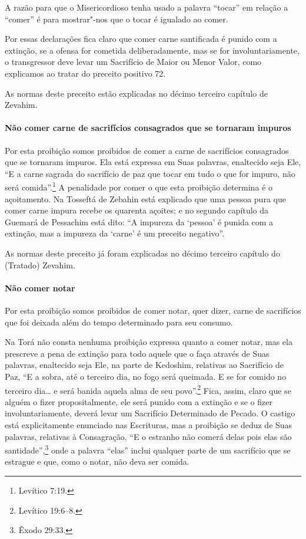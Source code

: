 \begin{multicols}{2}
A razão para que o Misericordioso tenha usado a palavra ``tocar'' em
relação a ``comer'' é para mostrar"-nos que o tocar é igualado ao comer.

Por essas declarações fica claro que comer carne santificada é punido
com a extinção, se a ofensa for cometida deliberadamente, mas se for
involuntariamente, o transgressor deve levar um Sacrifício de Maior ou
Menor Valor, como explicamos ao tratar do preceito positivo 72.

As normas deste preceito estão explicadas no décimo terceiro capítulo
de Zevahim\starr.

\paragraph{Não comer carne de sacrifícios consagrados que se tornaram impuros}

Por esta proibição somos proibidos de comer a carne de sacrifícios
consagrados que se tornaram impuros. Ela está expressa em Suas palavras,
enaltecido seja Ele, ``E a carne sagrada do sacrifício de paz que tocar
em tudo o que for impuro, não será comida''.\footnote{Levítico 7:19.} A
penalidade por comer o que esta proibição determina é o açoitamento. Na
Tosseftá\starr{} de Zebahin está explicado que uma pessoa pura que comer carne
impura recebe os quarenta açoites; e no segundo capítulo da Guemará\starr{} de Pessachim\starr{} está dito: ``A
impureza da `pessoa' é punida com a extinção, mas a impureza da `carne'
é um preceito negativo''.

As normas deste preceito já foram explicadas no décimo terceiro capítulo
do (Tratado) Zevahim\starr.

\paragraph{Não comer notar\starr}

Por esta proibição somos proibidos de comer notar\starr, quer dizer, carne
de sacrifícios que foi deixada além do tempo determinado para seu
consumo.

Na Torá\starr{} não consta nenhuma proibição expressa quanto a comer notar\starr,
mas ela prescreve a pena de extinção para todo aquele que o faça
através de Suas palavras, enaltecido seja Ele, na parte de Kedoshim\starr,
relativas ao Sacrifício de Paz, ``E a sobra, até o terceiro dia, no fogo
será queimada. E se for comido no terceiro dia\ldots{} e será banida aquela
alma de seu povo''.\footnote{Levítico 19:6--8.} Fica, assim, claro que se alguém o
fizer propositalmente, ele será punido com a extinção e se o fizer
involuntariamente, deverá levar um Sacrifício Determinado de Pecado. O
castigo está explicitamente enunciado nas Escrituras, mas a proibição
se deduz de Suas palavras, relativas à Consagração, ``E o estranho não
comerá delas pois elas são santidade'',\footnote{Êxodo 29:33.} onde a palavra
``elas'' inclui qualquer parte de um sacrifício que se estrague e que,
como o notar\starr, não deva ser comida.


\end{multicols}
